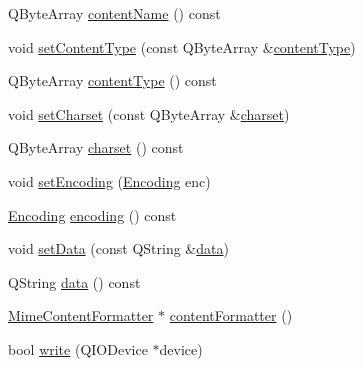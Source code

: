 \begin{DoxyCompactItemize}
\item 
Q\+Byte\+Array \hyperlink{class_simple_mail_1_1_mime_part_ad16adf3afc9873b4b0636cd3264e2f3e}{content\+Name} () const
\item 
void \hyperlink{class_simple_mail_1_1_mime_part_a5acb0f9b764b723c4cfb1058490d2d8d}{set\+Content\+Type} (const Q\+Byte\+Array \&\hyperlink{class_simple_mail_1_1_mime_part_a3952c9506cc3baf478ecf3a8c204297a}{content\+Type})
\item 
Q\+Byte\+Array \hyperlink{class_simple_mail_1_1_mime_part_a3952c9506cc3baf478ecf3a8c204297a}{content\+Type} () const
\item 
void \hyperlink{class_simple_mail_1_1_mime_part_a3ec15032385ee5687112e2e808d6170f}{set\+Charset} (const Q\+Byte\+Array \&\hyperlink{class_simple_mail_1_1_mime_part_a419b2efe442eb59002ae14c8ab18f94e}{charset})
\item 
Q\+Byte\+Array \hyperlink{class_simple_mail_1_1_mime_part_a419b2efe442eb59002ae14c8ab18f94e}{charset} () const
\item 
void \hyperlink{class_simple_mail_1_1_mime_part_a006db8e82f557f4fe92313e9f2a4c87d}{set\+Encoding} (\hyperlink{class_simple_mail_1_1_mime_part_ae67a2f5406958b95b18bf31a7bbeb5c9}{Encoding} enc)
\item 
\hyperlink{class_simple_mail_1_1_mime_part_ae67a2f5406958b95b18bf31a7bbeb5c9}{Encoding} \hyperlink{class_simple_mail_1_1_mime_part_a7e7b2d8b6f32175fbc9d62e5b23ca720}{encoding} () const
\item 
void \hyperlink{class_simple_mail_1_1_mime_part_aa179fea0ab0a77771cbec0944e6b7967}{set\+Data} (const Q\+String \&\hyperlink{class_simple_mail_1_1_mime_part_ab6260fc481df5162673f1ac93ec92dac}{data})
\item 
Q\+String \hyperlink{class_simple_mail_1_1_mime_part_ab6260fc481df5162673f1ac93ec92dac}{data} () const
\item 
\hyperlink{class_simple_mail_1_1_mime_content_formatter}{Mime\+Content\+Formatter} $\ast$ \hyperlink{class_simple_mail_1_1_mime_part_abbe3a57832537bf93b12b1cd9924024a}{content\+Formatter} ()
\item 
bool \hyperlink{class_simple_mail_1_1_mime_part_a4de9e52dca51bdc87cf526970606910d}{write} (Q\+I\+O\+Device $\ast$device)
\end{DoxyCompactItemize}
